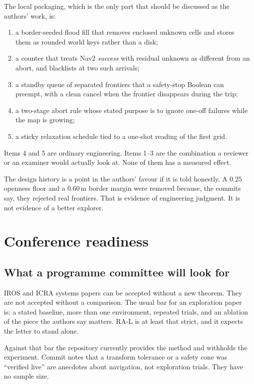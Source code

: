 \documentclass[11pt]{article}
\begin{document}
The local packaging, which is the only part that should be discussed as the authors' work, is:
\begin{enumerate}
\item a border-seeded flood fill that removes enclosed unknown cells and stores them as rounded world keys rather than a disk;
\item a counter that treats Nav2 \emph{success} with residual unknown as different from an abort, and blacklists at two such arrivals;
\item a standby queue of separated frontiers that a safety-stop Boolean can preempt, with a clean cancel when the frontier disappears during the trip;
\item a two-stage abort rule whose stated purpose is to ignore one-off failures while the map is growing;
\item a sticky relaxation schedule tied to a one-shot reading of the first grid.
\end{enumerate}
Items 4 and 5 are ordinary engineering. Items 1--3 are the combination a reviewer or an examiner would actually look at. None of them has a measured effect.

The design history is a point in the authors' favour if it is told honestly. A $0.25$ openness floor and a $0.60$\,m border margin were removed because, the commits say, they rejected real frontiers. That is evidence of engineering judgment. It is not evidence of a better explorer.

\section{Conference readiness}
\subsection{What a programme committee will look for}
IROS and ICRA systems papers can be accepted without a new theorem. They are not accepted without a comparison. The usual bar for an exploration paper is: a stated baseline, more than one environment, repeated trials, and an ablation of the piece the authors say matters. RA-L is at least that strict, and it expects the letter to stand alone.

Against that bar the repository currently provides the method and withholds the experiment. Commit notes that a transform tolerance or a safety cone was ``verified live'' are anecdotes about navigation, not exploration trials. They have no sample size.
\end{document}
